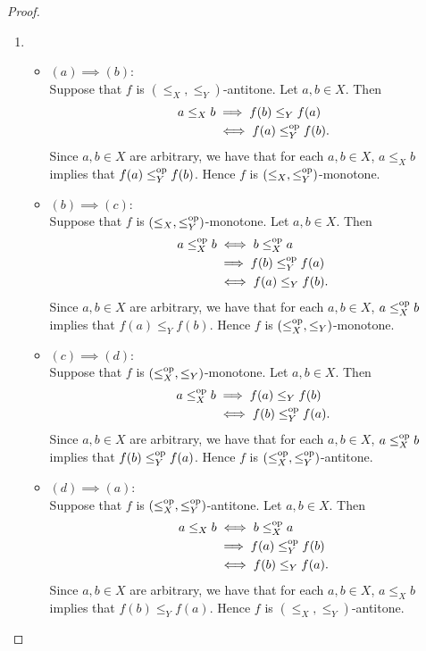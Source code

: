 \documentclass{book}
\begin{document}
	\begin{proof}\
		\begin{enumerate}
			\item 
			\begin{itemize}
				\item $(a) \implies (b)$: \\
				Suppose that $f$ is $(\leq_X, \leq_Y)$-antitone. Let $a,b \in X$. Then 
				\begin{align*}
					a \leq_X b 
					& \implies f(b) \leq_Y f(a) \\
					& \iff f(a) \leq^{\text{op}}_Y f(b).
				\end{align*}
				Since $a,b \in X$ are arbitrary, we have that for each $a,b \in X$, $a \leq_X b$ implies that $f(a) \leq^{\text{op}}_Y f(b)$. Hence $f$ is $(\leq_X, \leq^{\text{op}}_Y)$-monotone. 
				\item $(b) \implies (c)$: \\
				Suppose that $f$ is $(\leq_X, \leq^{\text{op}}_Y)$-monotone. Let $a,b \in X$. Then 
				\begin{align*}
					a \leq^{\text{op}}_X b
					& \iff b \leq^{\text{op}}_X a \\ 
					& \implies f(b) \leq^{\text{op}}_Y f(a) \\
					& \iff f(a) \leq_Y f(b).
				\end{align*}
				Since $a,b \in X$ are arbitrary, we have that for each $a,b \in X$, $a \leq^{\text{op}}_X b$ implies that $f(a) \leq_Y f(b)$. Hence $f$ is $(\leq^{\text{op}}_X, \leq_Y)$-monotone. 
				\item $(c) \implies (d)$: \\
				Suppose that $f$ is $(\leq^{\text{op}}_X, \leq_Y)$-monotone. Let $a,b \in X$. Then 
				\begin{align*}
					a \leq^{\text{op}}_X b
					& \implies f(a) \leq_Y f(b) \\
					& \iff f(b) \leq^{\text{op}}_Y f(a).
				\end{align*}
				Since $a,b \in X$ are arbitrary, we have that for each $a,b \in X$, $a \leq^{\text{op}}_X b$ implies that $f(b) \leq^{\text{op}}_Y f(a)$. Hence $f$ is $(\leq^{\text{op}}_X, \leq^{\text{op}}_Y)$-antitone. 
				\item $(d) \implies (a)$: \\
				Suppose that $f$ is $(\leq^{\text{op}}_X, \leq^{\text{op}}_Y)$-antitone. Let $a,b \in X$. Then 
				\begin{align*}
					a \leq_X b
					& \iff b \leq^{\text{op}}_X a \\
					& \implies f(a) \leq^{\text{op}}_Y f(b) \\
					& \iff f(b) \leq_Y f(a).
				\end{align*}
				Since $a,b \in X$ are arbitrary, we have that for each $a,b \in X$, $a \leq_X b$ implies that $f(b) \leq_Y f(a)$. Hence $f$ is $(\leq_X, \leq_Y)$-antitone. 

\end{itemize}
\end{enumerate}
\end{proof}
\end{document}
